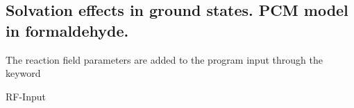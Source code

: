 %
%

\subsection{Solvation effects in ground states. PCM model in formaldehyde.}


The reaction field parameters are added to the 
 program input through the keyword

\begin{inputlisting}
RF-Input
\end{inputlisting}

